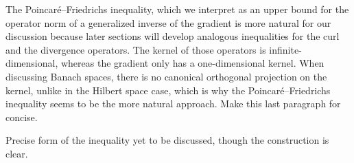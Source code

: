 \documentclass[a4paper]{amsart}
\begin{document}
\begin{remark}
    The Poincar\'e--Friedrichs inequality, which we interpret as an upper bound for the operator norm of a generalized inverse of the gradient is more natural for our discussion because later sections will develop analogous inequalities for the curl and the divergence operators. 
    The kernel of those operators is infinite-dimensional, whereas the gradient only has a one-dimensional kernel. 
    When discussing Banach spaces, there is no canonical orthogonal projection on the kernel, unlike in the Hilbert space case, 
    which is why the Poincar\'e--Friedrichs inequality seems to be the more natural approach.
    \color{red} Make this last paragraph for concise.
\end{remark}






\begin{theorem}
    \color{red}Precise form of the inequality yet to be discussed, though the construction is clear.
\end{theorem}
\end{document}
